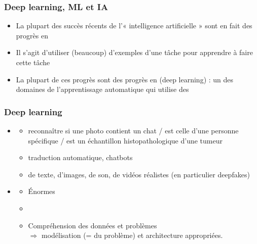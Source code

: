 \begin{frame}
  \frametitle{Deep learning, ML et IA}
  \begin{itemize}
  \item La plupart des succès récents de l'« intelligence artificielle » sont
    en fait des progrès en 
  \item[] Il s'agit d'utiliser (beaucoup) d'exemples d'une tâche pour apprendre à faire cette
    tâche
  \item La plupart de ces progrès sont des progrès en  (deep learning) : un des domaines de l'apprentissage automatique
    qui utilise des 
  \end{itemize}
\end{frame}

\begin{frame}
  \frametitle{Deep learning}
  \begin{itemize}
  \item {}
    \begin{itemize}
      \setlength{\itemsep}{5pt}
    \item {} reconnaître si une photo
      contient un chat / est celle d'une personne spécifique / est un
      échantillon histopathologique d'une tumeur
    \item {} traduction automatique,
      chatbots
    \item {} de texte, d'images, de son, de vidéos
      réalistes (en particulier deepfakes)
    \end{itemize}
  \item {}
    \begin{itemize}
      \setlength{\itemsep}{5pt}
    \item Énormes 
    \item {}
    \item Compréhension des données et problèmes \\$\Rightarrow$ modélisation (=
       du problème) et architecture appropriées.
    \end{itemize}
  \end{itemize}
\end{frame}

